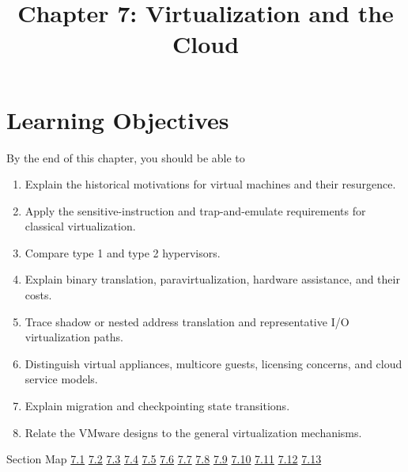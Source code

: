 \documentclass[10pt,letterpaper]{article}
\title{Chapter 7: Virtualization and the Cloud}
\author{}
\date{}
\begin{document}
\maketitle
\section*{Learning Objectives}
\begin{studybox}{By the end of this chapter, you should be able to}
\begin{enumerate}
  \item Explain the historical motivations for virtual machines and their resurgence.
  \item Apply the sensitive-instruction and trap-and-emulate requirements for classical virtualization.
  \item Compare type 1 and type 2 hypervisors.
  \item Explain binary translation, paravirtualization, hardware assistance, and their costs.
  \item Trace shadow or nested address translation and representative I/O virtualization paths.
  \item Distinguish virtual appliances, multicore guests, licensing concerns, and cloud service models.
  \item Explain migration and checkpointing state transitions.
  \item Relate the VMware designs to the general virtualization mechanisms.
\end{enumerate}
\end{studybox}

\begin{studybox}{Section Map}
\hyperlink{sec-7-1}{7.1} \quad \hyperlink{sec-7-2}{7.2} \quad \hyperlink{sec-7-3}{7.3} \quad \hyperlink{sec-7-4}{7.4} \quad \hyperlink{sec-7-5}{7.5} \quad \hyperlink{sec-7-6}{7.6} \quad \hyperlink{sec-7-7}{7.7} \quad \hyperlink{sec-7-8}{7.8} \quad \hyperlink{sec-7-9}{7.9} \quad \hyperlink{sec-7-10}{7.10} \quad \hyperlink{sec-7-11}{7.11} \quad \hyperlink{sec-7-12}{7.12} \quad \hyperlink{sec-7-13}{7.13}
\end{studybox}
\end{document}
